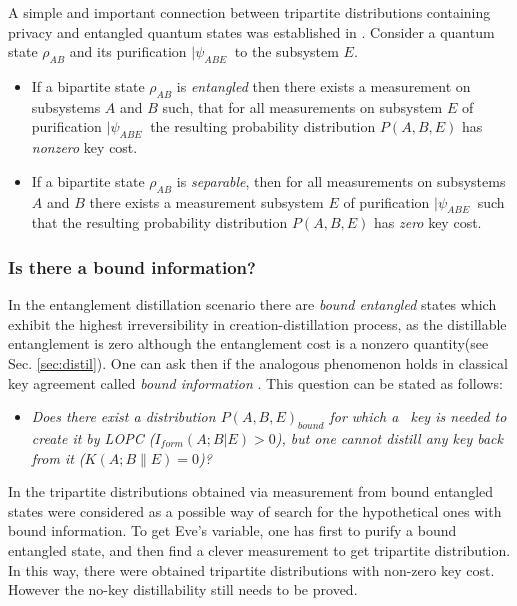 \documentclass[rmp,12pt,preprint]{revtex4-2}
\begin{document}
A simple and important connection between tripartite distributions
containing privacy and entangled quantum states was established in
\cite{GisinAcin_link}. Consider a quantum state $\rho_{AB}$ and its
purification $|\psi_{ABE}\>$ to the subsystem $E$.
\begin{itemize}
\item If a bipartite state $\rho_{AB}$ is {\it entangled} then there exists
a measurement on subsystems $A$ and $B$ such, that for all measurements on subsystem $E$ of purification $|\psi_{ABE}\>$ the resulting probability distribution
$P(A,B,E)$ has {\it nonzero} key cost.
\item If a bipartite state $\rho_{AB}$ is {\it separable}, then for all measurements on subsystems $A$ and $B$ there exists a measurement subsystem $E$ of purification $|\psi_{ABE}\>$ such that the resulting probability distribution $P(A,B,E)$ has {\it zero} key cost.
\end{itemize}

\subsubsection{Is there a bound information?}
In the entanglement distillation scenario there are {\it bound
entangled} states which exhibit the highest irreversibility in
creation-distillation process, as the distillable entanglement is
zero although the entanglement cost is a nonzero quantity(see
Sec. \ref{sec:distil}). One can ask then if the analogous
phenomenon holds in classical key agreement called {\it bound
information} \cite{GisinWolf_linking,renner-wolf-gap}. This question
can be stated as follows:

\begin{itemize}
\item{\it Does there exist a distribution $P(A,B,E)_{bound}$ for which a \secure\ key is needed to create it by LOPC ($I_{form}(A;B|E)>0$), but one cannot distill any key back
from it ($K(A;B\|E)=0$)?}
\end{itemize}




In \cite{GisinWolf_linking} the tripartite distributions obtained
via measurement from bound entangled states were considered as a
possible way of search for the hypothetical ones  with bound
information. To get Eve's variable, one has first to purify a bound
entangled state, and then find a clever measurement to get
tripartite distribution. In this way, there were obtained tripartite
distributions with non-zero key cost. However the no-key
distillability still needs to be proved.
\end{document}

